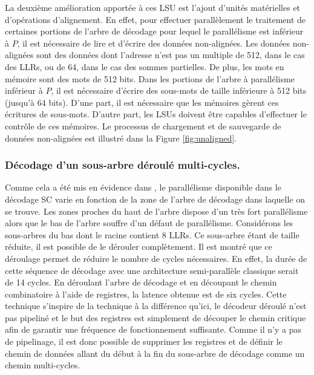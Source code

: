 La deuxième amélioration apportée à ces LSU est l'ajout d'unités matérielles et d'opérations d'alignement. En effet, pour effectuer parallèlement le traitement de certaines portions de l'arbre de décodage pour lequel le parallélisme est inférieur à $P$, il est nécessaire de lire et d'écrire des données non-alignées. Les données non-alignées sont des données dont l'adresse n'est pas un multiple de 512, dans le cas des LLRs, ou de 64, dans le cas des sommes partielles. De plus, les mots en mémoire sont des mots de 512 bits. Dans les portions de l'arbre à parallélisme inférieur à $P$, il est nécessaire d'écrire des sous-mots de taille inférieure à 512 bits (jusqu'à 64 bits). D'une part, il est nécessaire que les mémoires gèrent ces écritures de sous-mots. D'autre part, les LSUs doivent être capables d'effectuer le contrôle de ces mémoires. Le processus de chargement et de sauvegarde de données non-alignées est illustré dans la Figure \ref{fig:unaligned}.

\subsubsection{Décodage d'un sous-arbre déroulé multi-cycles.}

Comme cela a été mis en évidence dans \cite{gal_scalable_2016}, le parallélisme disponible dans le décodage SC varie en fonction de la zone de l'arbre de décodage dans laquelle on se trouve. Les zones proches du haut de l'arbre dispose d'un très fort parallélisme alors que le bas de l'arbre souffre d'un défaut de parallélisme. Considérons les sous-arbres du bas dont le \noeud racine contient 8 LLRs. Ce sous-arbre étant de taille réduite, il est possible de le dérouler complètement. Il est montré que ce déroulage permet de réduire le nombre de cycles nécessaires. En effet, la durée de cette séquence de décodage avec une architecture semi-parallèle classique serait de 14 cycles. En déroulant l'arbre de décodage et en découpant le chemin combinatoire à l'aide de registres, la latence obtenue est de six cycles. Cette technique s'inspire de la technique \cite{giard_unrolled_2015} à la différence qu'ici, le décodeur déroulé n'est pas pipeliné et le but des registres est simplement de découper le chemin critique afin de garantir une fréquence de fonctionnement suffisante. Comme il n'y a pas de pipelinage, il est donc possible de supprimer les registres et de définir le chemin de données allant du début à la fin du sous-arbre de décodage comme un chemin multi-cycles.

